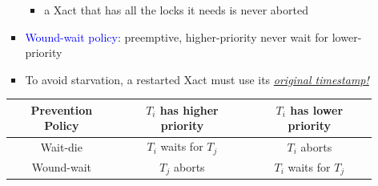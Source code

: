 \documentclass[10pt,landscape]{article}
\newcommand{\1}{\mathmybb{1}}
\begin{document}
\begin{multicols*}{3}
\begin{itemize}
\begin{itemize}
\begin{itemize}
\begin{itemize}
                \item a Xact that has all the locks it needs is never aborted
            \end{itemize}
            \item \textcolor{blue}{Wound-wait policy}: preemptive, higher-priority never wait for lower-priority
            \item To avoid starvation, a restarted Xact must use its \textit{\underline{original timestamp!}}
        \end{itemize}
            \tiny
            \begin{tabular}{|c|c|c|}
                \hline
                \rowcolor{lightgray}
                Prevention Policy & $T_i$ has higher priority & $T_i$ has lower priority \\
                \hline
                Wait-die & $T_i$ waits for $T_j$ & $T_i$ aborts \\
                \hline
                Wound-wait & $T_j$ aborts & $T_i$ waits for $T_j$ \\
                \hline
            \end{tabular}
    \end{itemize}
\end{itemize}


\end{multicols*}
\end{document}
